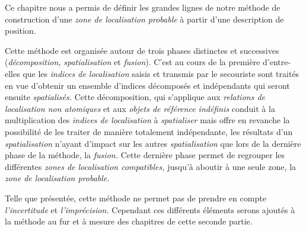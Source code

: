 Ce chapitre nous a permis de définir les grandes lignes de notre
méthode de construction d'une \emph{zone de localisation probable} à
partir d'une description de position.

Cette méthode est organisée autour de trois phases distinctes et
successives (\emph{décomposition,} \emph{spatialisation} et
\emph{fusion}). C'est au cours de la première d'entre-elles que les
\emph{indices de localisation} saisis et transmis par le secouriste
sont traités en vue d'obtenir un ensemble d'indices décomposés et
indépendants qui seront ensuite \emph{spatialisés.} Cette
décomposition, qui s'applique aux \emph{relations de localisation non
  atomiques} et aux \emph{objets de référence indéfinis} conduit à la
multiplication des \emph{indices de localisation} à \emph{spatialiser}
mais offre en revanche la possibilité de les traiter de manière
totalement indépendante, les résultats d'un \emph{spatialisation}
n'ayant d'impact sur les autres \emph{spatialisation} que lors de la
dernière phase de la méthode, la \emph{fusion.}  Cette dernière phase
permet de regrouper les différentes \emph{zones de localisation
  compatibles,} jusqu'à aboutir à une seule zone, la \emph{zone de
  localisation probable.}

Telle que présentée, cette méthode ne permet pas de prendre en compte
\emph{l'incertitude} et \emph{l'imprécision.} Cependant ces différents
éléments serons ajoutés à la méthode au fur et à mesure des chapitres
de cette seconde partie.
